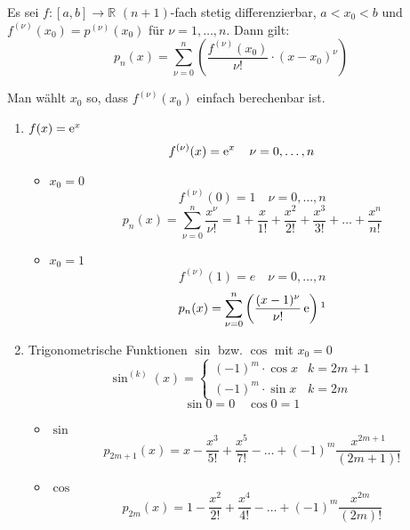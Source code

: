 \begin{theorem} Es sei $f: [a,b] \to \mathbb{R}$ $(n+1)$-fach stetig differenzierbar, $a < x_0 < b$ und $f^{(\nu)}(x_0) = p^{(\nu)}(x_0)$ für $\nu = 1, \ldots, n$. Dann gilt:
  \[ p_n(x) = \sum_{\nu = 0}^n \left( \frac{f^{(\nu)}(x_0)}{\nu !} \cdot (x - x_0)^\nu \right)\]
\end{theorem}

\begin{note}
  Man wählt $x_0$ so, dass $f^{(\nu)}(x_0)$ einfach berechenbar ist.
\end{note}


\begin{example}
  \begin{enumerate}
    \item $f(x) = \operatorname{e}^x$
      \[ f^{(\nu)}(x) = \operatorname{e}^x \quad \nu = 0, \ldots, n \]
      \begin{itemize}
        \item $x_0 = 0$
          \[ f^{(\nu)}(0) = 1 \quad \nu = 0, \ldots, n \]
          \[ p_n(x) = \sum_{\nu = 0}^n \frac{x^\nu}{\nu !} = 1 + \frac x {1!} + \frac{x^2}{2!} + \frac{x^3}{3!} + \ldots + \frac{x^n}{n!} \]
        \item $x_0 = 1$
          \[ f^{(\nu)}(1) = e \quad \nu = 0, \ldots, n \]
          \[ p_n(x) = \sum_{\nu = 0}^n \left( \frac{(x-1)^\nu}{\nu !} \euler \right)\annotation{\text{für $x = 1$ und $\nu = 0$ ist der Zähler $(1-1)^0 = 0^0 = 1$}} \]
      \end{itemize}
    \item Trigonometrische Funktionen $\sin$ bzw. $\cos$ mit $x_0 = 0$
      \[ \sin^{(k)}(x) = 
        \begin{cases}
          (-1)^m \cdot \cos x & k = 2m+1 \\
          (-1)^m \cdot \sin x & k = 2m
        \end{cases}
      \]
      \[ \sin 0 = 0 \quad \cos 0 = 1 \]
      \begin{itemize}
        \item $\sin$
          \[ p_{2m+1}(x) = x - \frac{x^3}{5!} + \frac{x^5}{7!} - \ldots + (-1)^m \frac{x^{2m+1}}{(2m+1)!} \]
        \item $\cos$
          \[ p_{2m}(x) = 1 - \frac{x^2}{2!} + \frac{x^4}{4!} - \ldots + (-1)^m \frac{x^{2m}}{(2m)!} \]
      \end{itemize}
  \end{enumerate}
\end{example}

